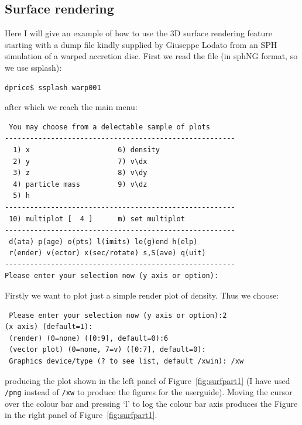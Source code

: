 \documentclass[a4paper,10pt]{article}
\begin{document}
\subsection{Surface rendering}
 Here I will give an example of how to use the 3D surface rendering feature starting with a dump file kindly supplied by Giuseppe Lodato from an SPH simulation of a warped accretion disc. First we read the file (in sphNG format, so we use ssplash):
\begin{verbatim}
dprice$ ssplash warp001
\end{verbatim}
after which we reach the main menu:
\begin{verbatim}
 You may choose from a delectable sample of plots 
-------------------------------------------------------
  1) x                     6) density             
  2) y                     7) v\dx                
  3) z                     8) v\dy                
  4) particle mass         9) v\dz                
  5) h                   
-------------------------------------------------------
 10) multiplot [  4 ]      m) set multiplot 
-------------------------------------------------------
 d(ata) p(age) o(pts) l(imits) le(g)end h(elp)
 r(ender) v(ector) x(sec/rotate) s,S(ave) q(uit)
-------------------------------------------------------
Please enter your selection now (y axis or option):
\end{verbatim}
 Firstly we want to plot just a simple render plot of density. Thus we choose:
\begin{verbatim}
 Please enter your selection now (y axis or option):2
(x axis) (default=1):
 (render) (0=none) ([0:9], default=0):6
 (vector plot) (0=none, 7=v) ([0:7], default=0):
 Graphics device/type (? to see list, default /xwin): /xw
\end{verbatim} 
producing the plot shown in the left panel of Figure~\ref{fig:surfpart1} (I have used \verb+/png+ instead of \verb+/xw+ to produce the figures for the userguide). Moving the cursor over the colour bar and pressing `l' to log the colour bar axis produces the Figure in the right panel of Figure~\ref{fig:surfpart1}.
\end{document}
